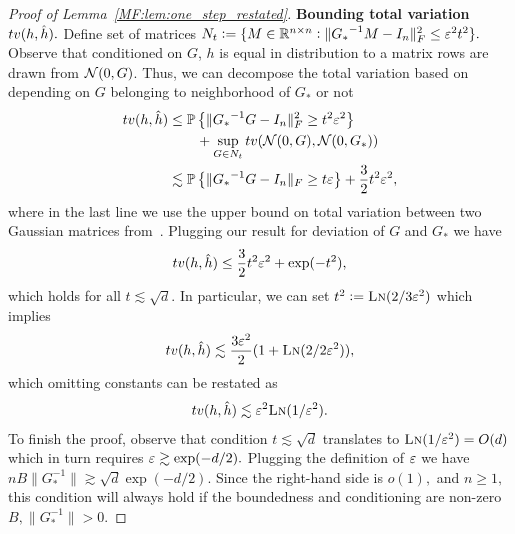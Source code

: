 \begin{proof}[Proof of Lemma~\ref{MF:lem:one_step_restated}]
\textbf{Bounding total variation ${{tv}}(h,\hat h).$} Define set of matrices $N_t:=\{M\in\mathbb{R}^{n\times n}: \lVert{G_*}^{-1}M- I_n\rVert_F^2\le {\varepsilon}^2 t^2 \}.$ 
Observe that conditioned on $G$, $h$ is equal in distribution to a matrix rows are drawn \iid from $\mathcal{N}(0,G)$. Thus, we can decompose the total variation based on depending on $G$ belonging to neighborhood of $G_*$ or not 
\begin{align}
    {{tv}}(h, \hat h)
    &\le \operatorname{\mathbb{P}}\big\{{\lVert{G_*}^{-1}G-I_n\rVert_F^2 \ge t^2{\varepsilon}^2 }\big\} \\
    & \qquad +  \sup_{G\in N_t}{{tv}}(\mathcal{N}(0,G),\mathcal{N}(0,G_*))\\
    & \lesssim \operatorname{\mathbb{P}}\big\{{\lVert{G_*}^{-1}G-I_n\rVert_F \ge t{\varepsilon}}\big\} + \frac{3}{2}t^2 {\varepsilon}^2 ,
\end{align}
where in the last line we use the upper bound on total variation between two Gaussian matrices from~\cite{devroye2018total}. Plugging our result for deviation of $G$ and $G_*$ we have
\begin{align}
    {{tv}}(h, \hat h)\le \frac{3}{2}t^2 {\varepsilon}^2 + \exp(-t^2),
\end{align}
which holds for all $t \lesssim \sqrt{d}.$ In particular, we can set $t^2:=\text{\sc{Ln}}(2/3{\varepsilon}^2)$ which implies
\begin{align}
    {{tv}}(h, \hat h) \lesssim \frac{3{\varepsilon}^2}{2}(1+\text{\sc{Ln}}(2/2{\varepsilon}^2)),
\end{align}
which omitting constants can be restated as 
\begin{align}
    {{tv}}(h, \hat h) \lesssim {\varepsilon}^2\text{\sc{Ln}}(1/{\varepsilon}^2).
\end{align}
To finish the proof, observe that condition $t\lesssim \sqrt{d}$ translates to $\text{\sc{Ln}}(1/{\varepsilon}^2)=O(d)$ which in turn requires ${\varepsilon} \gtrsim \exp(-d/2).$ Plugging the definition of ${\varepsilon}$ we have $n B \|G_*^{-1}\|\gtrsim \sqrt{d} \exp(-d/2).$ Since the right-hand side is $o(1),$ and $n\ge 1,$ this condition will always hold if the boundedness and conditioning are non-zero $B,\| G_*^{-1}\| > 0.$
\end{proof}


